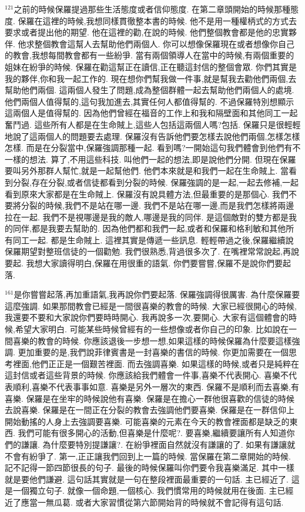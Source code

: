\documentclass{book}
\begin{document}
$^{121}$之前的時候保羅提過那些生活態度或者信仰態度.
在第二章頭開始的時候那種態度.
保羅在這裡的時候,我想同樣貫徹整本書的時候.
他不是用一種權柄式的方式去要求或者提出他的期望.
他在這裡的勸,在說的時候.
他們整個教會都是他的忠實夥伴.
他求整個教會這幫人去幫助他們兩個人.
你可以想像保羅現在或者想像你自己的教會,我想每間教會都有一些紛爭.
當有兩個領導人在當中的時候,有兩個重要的姐妹在紛爭的時候.
保羅在勸這幫正在讀信,正在聽這封信的整個會眾.
你們其實是我的夥伴,你和我一起工作的.
現在想你們幫我做一件事,就是幫我去勸他們兩個,去幫助他們兩個.
這兩個人發生了問題,成為整個群體一起去幫助他們兩個人的處境.
他們兩個人值得幫的,這句我加進去,其實任何人都值得幫的.
不過保羅特別想顯示這兩個人是值得幫的.
因為他們曾經在福音的工作上和我和隔壁面和其他同工一起奮鬥過.
這些所有人都是在生命賊上,這些人包括這兩個人嗎?包括.
保羅只是很輕輕地說了這兩個人的問題要去處理.
保羅沒有告訴他們要怎樣去說他們兩個,怎樣怎樣怎樣.
而是在分裂當中,保羅強調那種一起.
看到嗎?一開始這句我們體會到他們有不一樣的想法.
算了,不用這些科技.
叫他們一起的想法,即是說他們分開.
但現在保羅要叫另外那群人幫忙,就是一起幫他們.
他們本來就是和我們一起在生命賊上.
當看到分裂,存在分裂,或者信徒都看到分裂的時候.
保羅強調的是一起,一起去修補,一起看到原來大家都是在生命賊上.
保羅沒有說具體方法,但最重要的是那個心.
我們不要將分裂的時候,我們不是站在哪一邊.
我們不是站在哪一邊,而是我們怎樣將兩邊拉在一起.
我們不是視哪邊是我的敵人,哪邊是我的同伴.
是這個敵對的雙方都是我的同伴,都是我要去幫助的.
因為他們都和我們一起,或者和保羅和格利敏和其他所有同工一起.
都是生命賊上.
這裡其實是傳遞一些訊息.
輕輕帶過之後,保羅繼續說保羅期望對整班信徒的一個勸勉.
我們很熟悉,背過很多次了.
在嘴裡常常說起,再說要起.
我想大家讀得明白,保羅在用很重的語氣.
你們要嘗嘗,保羅不是說你們要起落.

$^{161}$是你嘗嘗起落,再加重語氣,我再說你們要起落.
保羅強調得很厲害.
為什麼保羅要這麼強調.
如果那間教會已經是一間很喜樂的教會的時候.
大家已經很開心的時候,我還要不要和大家說你們要時時開心.
我再說多一次,要開心.
大家有這個體會的時候,希望大家明白.
可能某些時候曾經有的一些想像或者你自己的印象.
比如說在一間喜樂的教會的時候.
你應該退後一步想一想,如果這樣的時候保羅為什麼要這樣強調.
更加重要的是,我們說菲律賓書是一封喜樂的書信的時候.
你更加需要在一個思考裡面,他們正正是一個艱苦裡面.
而去強調喜樂.
如果這樣的時候,或者只是純粹在這封信或者這些背景的時候.
你應該給我們體會一件事,喜樂不代表開心.
喜樂不代表順利,喜樂不代表事事如意.
喜樂是另外一層次的東西.
保羅不是順利而去喜樂,有喜樂.
保羅是在坐牢的時候說他有喜樂.
保羅是在擔心一群他很喜歡的信徒的時候去說喜樂.
保羅是在一間正在分裂的教會去強調他們要喜樂.
保羅是在一群信仰上開始動搖的人身上去強調要喜樂.
可能喜樂的元素在今天的教會裡面都是缺乏的東西.
我們可能有很多開心的活動,但喜樂是什麼呢?.
要喜樂,繼續要讓所有人知道你們的謙讓.
為什麼要特別提謙讓?.
在紛爭裡面自然就沒有謙讓的了.
如果有謙讓就不會有紛爭了.
第一,正正讓我們回到上一篇的時候.
當保羅在第二章開始的時候.
記不記得一節四節很長的句子.
最後的時候保羅叫你們要令我喜樂滿足.
其中一樣就是要他們謙避.
這句話其實就是一句在整段裡面最重要的一句話.
主已經近了.
這是一個獨立句子.
就像一個命題,一個核心.
我們慣常用的時候就用在後面.
主已經近了應當一無瓜葛.
或者大家習慣從第六節開始背的時候就不會記得有這句話.
\end{document}
